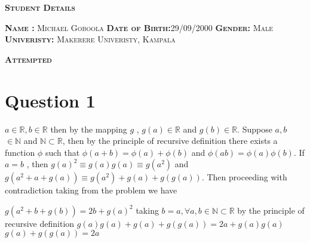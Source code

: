 \documentclass[a4paper, 12pt]{article}
\begin{document}
\begin{center}
    \fontsize{24pt}{10pt}\selectfont
    \textsc{\textbf{Student Details \newline}}
\end{center}

\begin{justify}
    \bigskip
    \bigskip
    \bigskip
    \bigskip
    \bigskip
    \bigskip
    \bigskip
    \bigskip
    \fontsize{16pt}{10pt}\selectfont
    \bigskip
    \textsc{\textbf{Name : \:\:\:\:\:\:\:\:\: \:\:\:\:} Michael Goboola \newline }
    \textsc{\textbf{Date of Birth:\:\:\:}29/09/2000 \newline}
    \textsc{\textbf{Gender: \: \: \:\:\:\:\:\:} Male \newline}
    \textsc{\textbf{Univeristy: \:\:\:\:\:} Makerere Univeristy, Kampala \newline}
\end{justify}

\newpage

\begin{center}
    \fontsize{24pt}{10pt}\selectfont
    \textsc{\textbf{Attempted}}
\end{center}

\section{Question 1}

$a  \in  \mathbb{R}, b  \in  \mathbb{R}$ then by  the mapping $g$ , $g(a)  \in \mathbb{R}$ and
$g(b) \in \mathbb{R}$. Suppose $a,b$ $\in \mathbb{N}$  and $\mathbb{N} \subset \mathbb{R}$, 
then by the principle of recursive definition there exists a function $\phi$ such that
$\phi(a + b) = \phi(a) + \phi(b)$ and $\phi(ab) = \phi(a)\phi(b)$.
If $a = b$ , then $g(a)^2 \equiv g(a)g(a) \equiv g(a^2)$  and $g(a^2 + a + g(a)) \equiv g(a^2)  + g(a) + g(g(a))$.
Then proceeding with contradiction taking from the problem we have

   \begin{justify} 
    \begin{center}
    $g(a^2 + b + g(b)) = 2b + g(a)^2$ \newline
    taking $b = a, \forall a,b \in \mathbb{N} \subset\mathbb{R}$ \newline 
    by the principle of recursive definition \newline
    $g(a)g(a) + g(a) + g(g(a)) = 2a + g(a)g(a)$ \newline
    $g(a) + g(g(a)) = 2a$ \newline
    \end{center}
   \end{justify}
\end{document}
